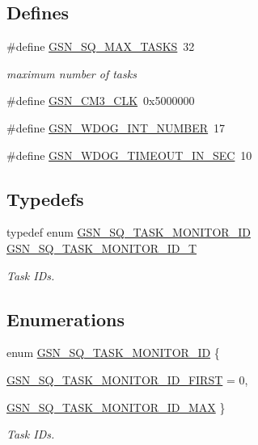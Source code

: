 \subsection*{Defines}
\begin{DoxyCompactItemize}
\item 
\#define \hyperlink{a00675_gaad089e403699cbffe3ae8ccddc6a2fa2}{GSN\_\-SQ\_\-MAX\_\-TASKS}~32
\begin{DoxyCompactList}\small\item\em maximum number of tasks \end{DoxyCompactList}\item 
\#define \hyperlink{a00593_a35b32ccea91b55e06b21da8d33908d47}{GSN\_\-CM3\_\-CLK}~0x5000000
\item 
\#define \hyperlink{a00593_a5b2d0d53bec6a4677fc2a92ceabebf3a}{GSN\_\-WDOG\_\-INT\_\-NUMBER}~17
\item 
\#define \hyperlink{a00593_a834c876307d18c3a77fde059aaf17061}{GSN\_\-WDOG\_\-TIMEOUT\_\-IN\_\-SEC}~10
\end{DoxyCompactItemize}
\subsection*{Typedefs}
\begin{DoxyCompactItemize}
\item 
typedef enum \hyperlink{a00675_gabf7d0df05da1734b65c7831213712b38}{GSN\_\-SQ\_\-TASK\_\-MONITOR\_\-ID} \hyperlink{a00675_ga953706c798c40007d94a580180412cbc}{GSN\_\-SQ\_\-TASK\_\-MONITOR\_\-ID\_\-T}
\begin{DoxyCompactList}\small\item\em Task IDs. \end{DoxyCompactList}\end{DoxyCompactItemize}
\subsection*{Enumerations}
\begin{DoxyCompactItemize}
\item 
enum \hyperlink{a00675_gabf7d0df05da1734b65c7831213712b38}{GSN\_\-SQ\_\-TASK\_\-MONITOR\_\-ID} \{ \par
\hyperlink{a00675_ggabf7d0df05da1734b65c7831213712b38a246f41404878a57d9ffd06087a7668de}{GSN\_\-SQ\_\-TASK\_\-MONITOR\_\-ID\_\-FIRST} =  0, 
\par
\hyperlink{a00675_ggabf7d0df05da1734b65c7831213712b38a67e6b7edb548bc21bf0a9b23f6bb3ece}{GSN\_\-SQ\_\-TASK\_\-MONITOR\_\-ID\_\-MAX}
 \}
\begin{DoxyCompactList}\small\item\em Task IDs. \end{DoxyCompactList}\end{DoxyCompactItemize}
